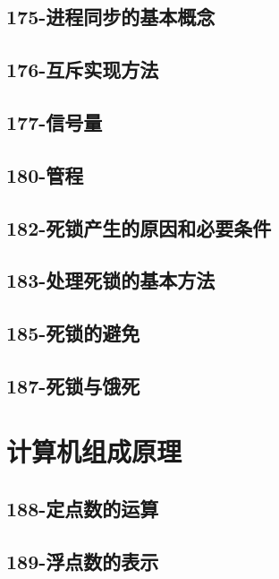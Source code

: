 \subsection{175-进程同步的基本概念}

\subsection{176-互斥实现方法}

\subsection{177-信号量}

\subsection{180-管程}

\subsection{182-死锁产生的原因和必要条件}

\subsection{183-处理死锁的基本方法}

\subsection{185-死锁的避免}

\subsection{187-死锁与饿死}


\section{计算机组成原理}

\subsection{188-定点数的运算}

\subsection{189-浮点数的表示}


